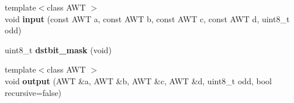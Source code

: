 \begin{DoxyCompactItemize}
\item 
\hypertarget{structpc98__egc__shifter_a772c342a70772797895d5ee88db8ed45}{{\footnotesize template$<$class A\-W\-T $>$ }\\void {\bfseries input} (const A\-W\-T a, const A\-W\-T b, const A\-W\-T c, const A\-W\-T d, uint8\-\_\-t odd)}\label{structpc98__egc__shifter_a772c342a70772797895d5ee88db8ed45}

\item 
\hypertarget{structpc98__egc__shifter_a6d79f5e565263844efd0f70cd8cc8761}{uint8\-\_\-t {\bfseries dstbit\-\_\-mask} (void)}\label{structpc98__egc__shifter_a6d79f5e565263844efd0f70cd8cc8761}

\item 
\hypertarget{structpc98__egc__shifter_a4b4c6a8e53b15237e1f0e9c39c7fed7a}{{\footnotesize template$<$class A\-W\-T $>$ }\\void {\bfseries output} (A\-W\-T \&a, A\-W\-T \&b, A\-W\-T \&c, A\-W\-T \&d, uint8\-\_\-t odd, bool recursive=false)}\label{structpc98__egc__shifter_a4b4c6a8e53b15237e1f0e9c39c7fed7a}

\end{DoxyCompactItemize}
